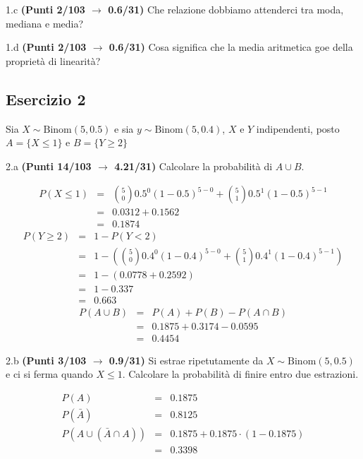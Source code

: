 \documentclass[
  11pt,
]{book}
\theoremstyle{mytheoremstyle}
\theoremstyle{mydefstyle}
\newenvironment{sol}
  {
  \begin{tcolorbox}[enhanced,breakable,arc=0.1mm,boxrule=1pt,colback=white,colframe=iblue,
  title=\bf \fontfamily{lmss}\selectfont \hspace{.5 cm} Soluzione,drop fuzzy shadow]

}{
\end{tcolorbox}
  }
\begin{document}
1.c \textbf{(Punti 2/103 \(\rightarrow\) 0.6/31)} Che relazione dobbiamo attenderci tra moda, mediana e media?

1.d \textbf{(Punti 2/103 \(\rightarrow\) 0.6/31)} Cosa significa che la media aritmetica goe della proprietà di linearità?

\subsection{Esercizio 2}\label{esercizio-2-28}

Sia \(X\sim\text{Binom}(5,0.5)\) e sia \(y\sim\text{Binom}(5,0.4)\), \(X\) e \(Y\) indipendenti, posto \(A=\{X\le 1\}\) e \(B=\{Y\ge 2\}\)

2.a \textbf{(Punti 14/103 \(\rightarrow\) 4.21/31)} Calcolare la probabilità di \(A\cup B\).

\begin{sol}
\normalsize 
\begin{eqnarray*}
      P( X \leq 1 ) &=& \binom{ 5 }{ 0 } 0.5 ^{ 0 }(1- 0.5 )^{ 5 - 0 }+\binom{ 5 }{ 1 } 0.5 ^{ 1 }(1- 0.5 )^{ 5 - 1 } \\                 &=& 0.0312+0.1562 \\                 &=& 0.1874 
   \end{eqnarray*}
\normalsize  \normalsize 
\begin{eqnarray*}
      P( Y \geq 2 ) &=& 1-P( Y < 2 ) \\                 &=& 1-\left( \binom{ 5 }{ 0 } 0.4 ^{ 0 }(1- 0.4 )^{ 5 - 0 }+\binom{ 5 }{ 1 } 0.4 ^{ 1 }(1- 0.4 )^{ 5 - 1 } \right)\\                 &=& 1-( 0.0778+0.2592 )\\                 &=& 1- 0.337 \\                 &=&   0.663 
   \end{eqnarray*}
\normalsize 
\begin{eqnarray*}
  P(A\cup B) &=&  P(A)+P(B)-P(A\cap B)\\
  &=& 0.1875+0.3174-0.0595\\
  &=& 0.4454
\end{eqnarray*}

\end{sol}

2.b \textbf{(Punti 3/103 \(\rightarrow\) 0.9/31)} Si estrae ripetutamente da \(X\sim\text{Binom}(5,0.5)\) e ci si ferma quando \(X\le 1\). Calcolare la probabilità di finire entro due estrazioni.

\begin{sol}
\begin{eqnarray*}
  P(A) &=&  0.1875\\
  P(\bar A) &=& 0.8125\\
  P(A\cup (\bar A\cap A))&=& 0.1875+0.1875\cdot (1-0.1875)\\
  &=& 0.3398
\end{eqnarray*}

\end{sol}
\end{document}
